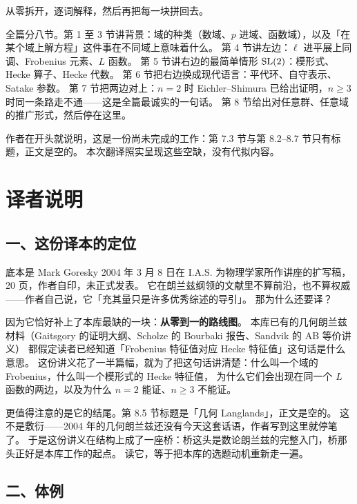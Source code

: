\noindent
从零拆开，逐词解释，然后再把每一块拼回去。

全篇分八节。第 1 至 3 节讲背景：域的种类（数域、$p$ 进域、函数域），以及「在某个域上解方程」这件事在不同域上意味着什么。
第 4 节讲左边：$\ell$ 进平展上同调、Frobenius 元素、$L$ 函数。
第 5 节讲右边的最简单情形 $\mathrm{SL}(2)$：模形式、Hecke 算子、Hecke 代数。
第 6 节把右边换成现代语言：平代环、自守表示、Satake 参数。
第 7 节把两边对上：$n=2$ 时 Eichler–Shimura 已给出证明，$n\ge 3$ 时同一条路走不通——这是全篇最诚实的一句话。
第 8 节给出对任意群、任意域的推广形式，然后停在这里。

作者在开头就说明，这是一份尚未完成的工作：第 7.3 节与第 8.2–8.7 节只有标题，正文是空的。
本次翻译照实呈现这些空缺，没有代拟内容。

\section*{译者说明}

\subsection*{一、这份译本的定位}

底本是 Mark Goresky 2004 年 3 月 8 日在 I.A.S. 为物理学家所作讲座的扩写稿，20 页，作者自印，未正式发表。
它在朗兰兹纲领的文献里不算前沿，也不算权威——作者自己说，它「充其量只是许多优秀综述的导引」。
那为什么还要译？

因为它恰好补上了本库最缺的一块：\textbf{从零到一的路线图}。
本库已有的几何朗兰兹材料（Gaitsgory 的证明大纲、Scholze 的 Bourbaki 报告、Sandvik 的 AB 等价讲义）
都假定读者已经知道「Frobenius 特征值对应 Hecke 特征值」这句话是什么意思。
这份讲义花了一半篇幅，就为了把这句话讲清楚：什么叫一个域的 Frobenius，什么叫一个模形式的 Hecke 特征值，
为什么它们会出现在同一个 $L$ 函数的两边，以及为什么 $n=2$ 能证、$n\ge 3$ 不能证。

更值得注意的是它的结尾。第 8.5 节标题是「几何 Langlands」，正文是空的。
这不是敷衍——2004 年的几何朗兰兹还没有今天这套话语，作者写到这里就停笔了。
于是这份讲义在结构上成了一座桥：桥这头是数论朗兰兹的完整入门，桥那头正好是本库工作的起点。
读它，等于把本库的选题动机重新走一遍。

\subsection*{二、体例}


